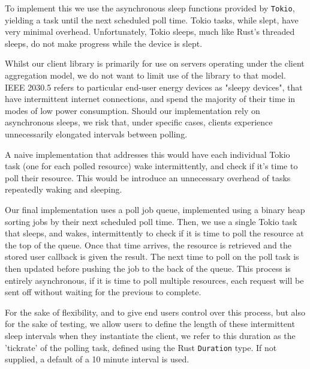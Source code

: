 To implement this we use the asynchronous sleep functions provided by \texttt{Tokio}, yielding a  task until the next scheduled poll time. Tokio tasks, while slept, have very minimal overhead. Unfortunately, Tokio sleeps, much like Rust's threaded sleeps, do not make progress while the device is slept. 

Whilst our client library is primarily for use on servers operating under the client aggregation model, we do not want to limit use of the library to that model. IEEE 2030.5 refers to particular end-user energy devices as "sleepy devices", that have intermittent internet connections, and spend the majority of their time in modes of low power consumption. Should our implementation rely on asynchronous sleeps, we risk that, under specific cases, clients experience unnecessarily elongated intervals between polling.

A naive implementation that addresses this would have each individual Tokio task (one for each polled resource) wake intermittently, and check if it's time to poll their resource. This would be introduce an unnecessary overhead of tasks repeatedly waking and sleeping.

Our final implementation uses a poll job queue, implemented using a binary heap sorting jobs by their next scheduled poll time. Then, we use a single Tokio task that sleeps, and wakes, intermittently to check if it is time to poll the resource at the top of the queue. Once that time arrives, the resource is retrieved and the stored user callback is given the result. The next time to poll on the poll task is then updated before pushing the job to the back of the queue. This process is entirely asynchronous, if it is time to poll multiple resources, each request will be sent off without waiting for the previous to complete. 

For the sake of flexibility, and to give end users control over this process, but also for the sake of testing, we allow users to define the length of these intermittent sleep intervals when they instantiate the client, we refer to this duration as the 'tickrate' of the polling task, defined using the Rust \texttt{Duration} type. If not supplied, a default of a 10 minute interval is used.

